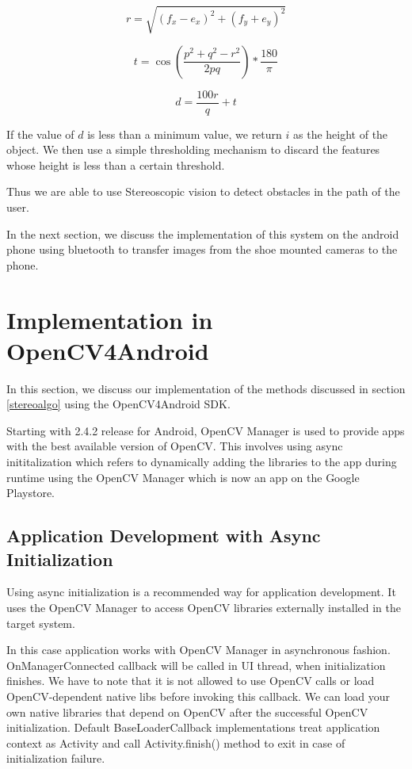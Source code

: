 \documentclass[11pt]{report}
\begin{document}
\begin{equation}
r = \sqrt{(f_x - e_x)^2 + (f_y + e_y)^2}
\end{equation} 

\begin{equation}
t = \cos(\frac{p^2+q^2-r^2}{2pq}) *\frac{180}{\pi}
\end{equation} 

\begin{equation}
d= \frac{100r}{q} + t
\end{equation}

If the value of $d$ is less than a minimum value, we return $i$ as the height of the object. We then use a simple thresholding mechanism to discard the features whose height is less than a certain threshold.

Thus we are able to use Stereoscopic vision to detect obstacles in the path of the user.

In the next section, we discuss the implementation of this system on the android phone using bluetooth to transfer images from the shoe mounted cameras to the phone.

\section{Implementation in OpenCV4Android}

In this section, we discuss our implementation of the methods discussed in section \ref{stereoalgo} using the OpenCV4Android SDK. 

Starting with 2.4.2 release for Android, OpenCV Manager is used to provide apps with the best available version of OpenCV. This involves using async inititalization which refers to dynamically adding the libraries to the app during runtime using the OpenCV Manager which is now an app on the Google Playstore\cite{playstore}.

\subsection{Application Development with Async Initialization}

Using async initialization is a recommended way for application development. It uses the OpenCV Manager to access OpenCV libraries externally installed in the target system.

In this case application works with OpenCV Manager in asynchronous fashion. OnManagerConnected callback will be called in UI thread, when initialization finishes. We have to note that it is not allowed to use OpenCV calls or load OpenCV-dependent native libs before invoking this callback. We can load your own native libraries that depend on OpenCV after the successful OpenCV initialization. Default BaseLoaderCallback implementations treat application context as Activity and call Activity.finish() method to exit in case of initialization failure.
\end{document}
